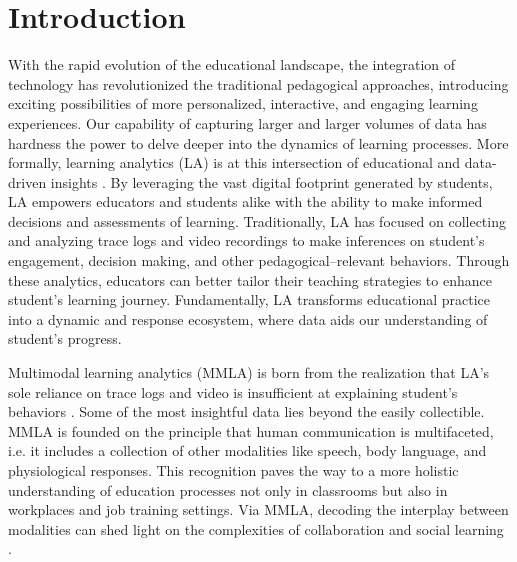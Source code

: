 \documentclass[manuscript,screen,review]{acmart}
\begin{document}
\section{Introduction} \label{sec:intro}


With the rapid evolution of the educational landscape, the integration of technology has revolutionized the traditional pedagogical approaches, introducing exciting possibilities of more personalized, interactive, and engaging learning experiences. Our capability of capturing larger and larger volumes of data has hardness the power to delve deeper into the dynamics of learning processes. More formally, learning analytics (LA) is at this intersection of educational and data-driven insights \cite{}. By leveraging the vast digital footprint generated by students, LA empowers educators and students alike with the ability to make informed decisions and assessments of learning. Traditionally, LA has focused on collecting and analyzing trace logs and video recordings to make inferences on student's engagement, decision making, and other pedagogical--relevant behaviors. Through these analytics, educators can better tailor their teaching strategies to enhance student's learning journey. Fundamentally, LA transforms educational practice into a dynamic and response ecosystem, where data aids our understanding of student's progress.

Multimodal learning analytics (MMLA) is born from the realization that LA's sole reliance on trace logs and video is insufficient at explaining student's behaviors \cite{}. Some of the most insightful data lies beyond the easily collectible. MMLA is founded on the principle that human communication is multifaceted, i.e. it includes a collection of other modalities like speech, body language, and physiological responses. This recognition paves the way to a more holistic understanding of education processes not only in classrooms but also in workplaces and job training settings. Via MMLA, decoding the interplay between modalities can shed light on the complexities of collaboration and social learning \cite{}.
\end{document}
